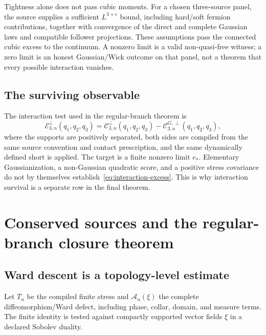 \documentclass[11pt,a4paper,oneside]{book}
\theoremstyle{plain}
\theoremstyle{definition}
\theoremstyle{remark}
\newcommand{\src}[2]{\cite{#1}}
\begin{document}
Tightness alone does not pass cubic moments. For a chosen three-source panel, the source supplies a sufficient $L^{3+\epsilon}$ bound, including hard/soft fermion contributions, together with convergence of the direct and complete Gaussian laws and compatible follower projections. These assumptions pass the connected cubic excess to the continuum. A nonzero limit is a valid non-quasi-free witness; a zero limit is an honest Gaussian/Wick outcome on that panel, not a theorem that every possible interaction vanishes. \src{R18}{thm:v18v48-cubic-landing}

\section{The surviving observable}
The interaction test used in the regular-branch theorem is
\begin{equation}
 \mathcal E_{3,n}^{\perp}(q_1,q_2,q_3)
 =\mathcal C_{3,n}^{\perp}(q_1,q_2,q_3)
  -\mathcal C_{3,n}^{G,\perp}(q_1,q_2,q_3),
 \label{eq:interaction-excess}
\end{equation}
where the supports are positively separated, both sides are compiled from the same source convention and contact prescription, and the same dynamically defined short is applied. The target is a finite nonzero limit $e_*$. Elementary Gaussianization, a non-Gaussian quadratic score, and a positive stress covariance do not by themselves establish~\eqref{eq:interaction-excess}. This is why interaction survival is a separate row in the final theorem.


\chapter{Conserved sources and the regular-branch closure theorem}
\label{ch:closure}
\section{Ward descent is a topology-level estimate}
Let $T_n$ be the compiled finite stress and $\mathcal A_n(\xi)$ the complete diffeomorphism/Ward defect, including phase, collar, domain, and measure terms. The finite identity is tested against compactly supported vector fields $\xi$ in a declared Sobolev duality.
\end{document}
